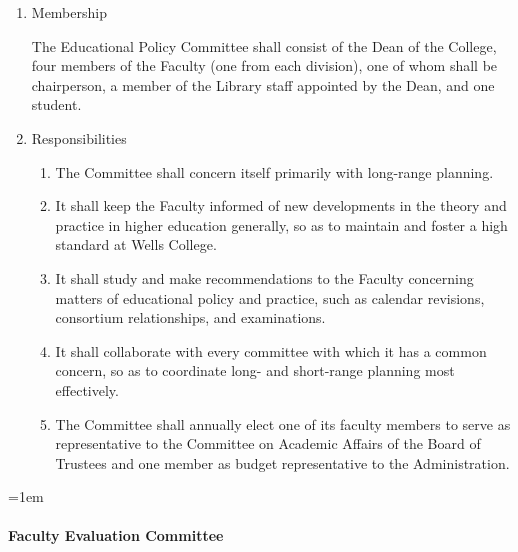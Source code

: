 \documentclass{manual}
\let\oldparagraph\paragraph
\renewcommand\paragraph{\leftskip=1em\oldparagraph}
\newcommand{\itemLevelA}{\alph*.}
\newcommand{\itemLevelB}{\arabic*)}
\newcommand{\itemRefA}{\alph*}
\newcommand{\itemRefB}{\arabic*}
\begin{document}
\begin{enumerate}[label=\itemLevelA,ref=\itemRefA]
\item Membership

The Educational Policy Committee shall consist of the Dean of the College, four members of the Faculty (one from each division), one of whom shall be chairperson, a member of the Library staff appointed by the Dean, and one student.
\item Responsibilities
\begin{enumerate}[label=\itemLevelB,ref=\itemRefB]
\item The Committee shall concern itself primarily with long-range planning.
\item It shall keep the Faculty informed of new developments in the theory and practice in higher education generally, so as to maintain and foster a high standard at Wells College.
\item It shall study and make recommendations to the Faculty concerning matters of educational policy and practice, such as calendar revisions, consortium relationships, and examinations.
\item It shall collaborate with every committee with which it has a common concern, so as to coordinate long- and short-range planning most effectively.
\item The Committee shall annually elect one of its faculty members to serve as representative to the Committee on Academic Affairs of the Board of Trustees and one member as budget representative to the Administration.

\end{enumerate}
\end{enumerate}

\paragraph{Faculty Evaluation Committee}\label{par:FacultyEvaluationCommittee}
\end{document}

